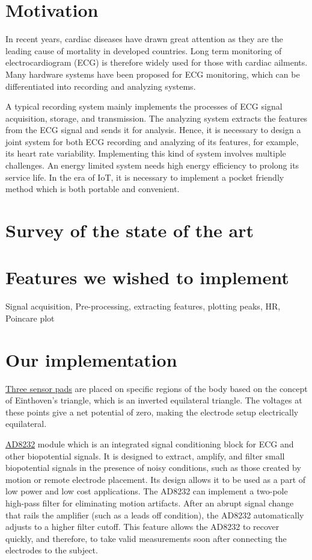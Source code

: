 \documentclass[11pt]{article}
\theoremstyle{definition}
\begin{document}
  \section{Motivation}
  In recent years, cardiac diseases have drawn great attention as they are the leading cause of mortality in developed countries.
  Long term monitoring of electrocardiogram (ECG) is therefore widely used for those with cardiac ailments.
  Many hardware systems have been proposed for ECG monitoring, which can be differentiated into recording and analyzing systems.

  A typical recording system mainly implements the processes of ECG signal acquisition, storage, and transmission.
  The analyzing system extracts the features from the ECG signal and sends it for analysis.
  Hence, it is necessary to design a joint system for both ECG recording and analyzing of its features, for example, its heart rate variability. Implementing this kind of system involves multiple challenges.
  An energy limited system needs high energy efficiency to prolong its service life.
  In the era of IoT, it is necessary to implement a pocket friendly method which is both portable and convenient.


  \section{Survey of the state of the art}


  \section{Features we wished to implement}
  Signal acquisition, Pre-processing, extracting features, plotting peaks, HR, Poincare plot


  \section{Our implementation}
  \underline{Three sensor pads} are placed on specific regions of the body based on the concept of Einthoven’s triangle\cite{abi2019einthoven}, which is an inverted equilateral triangle. The voltages at these points give a net potential of zero, making the electrode setup electrically equilateral.


  \underline{AD8232}\cite{ae:ad8232} module which is an integrated signal conditioning block for ECG and other biopotential signals.
  It is designed to extract, amplify, and filter small biopotential signals in the presence of noisy conditions, such as those created by motion or remote electrode placement.
  Its design allows it to be used as a part of low power and low cost applications.
  The AD8232 can implement a two-pole high-pass filter for eliminating motion artifacts.
  After an abrupt signal change that rails the amplifier (such as a leads off condition), the AD8232 automatically adjusts to a higher filter cutoff.
  This feature allows the AD8232 to recover quickly, and therefore, to take valid measurements soon after connecting the electrodes to the subject.
\end{document}
